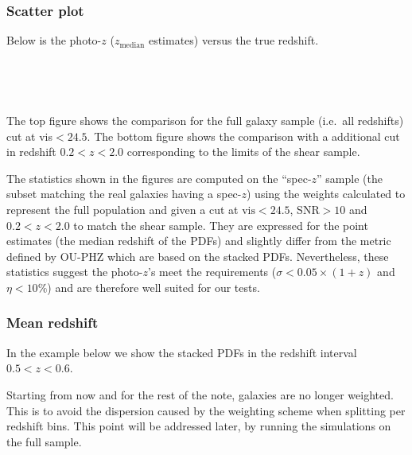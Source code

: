 \documentclass{article}
\begin{document}
\hypertarget{scatter-plot}{%
\subsubsection{Scatter plot}\label{scatter-plot}}

Below is the photo-\(z\) (\(z_\mathrm{median}\) estimates) versus the
true redshift.


    \begin{center}
    \end{center}
    { \hspace*{\fill} \\}
    
    \begin{center}
    \end{center}
    { \hspace*{\fill} \\}
    
    The top figure shows the comparison for the full galaxy sample (i.e.~all
redshifts) cut at vis\(<24.5\). The bottom figure shows the comparison
with a additional cut in redshift \(0.2<z<2.0\) corresponding to the
limits of the shear sample.

The statistics shown in the figures are computed on the ``spec-\(z\)''
sample (the subset matching the real galaxies having a spec-\(z\)) using
the weights calculated to represent the full population and given a cut
at \(\mathrm{vis}<24.5\), SNR\(>10\) and \(0.2<z<2.0\) to match the
shear sample. They are expressed for the point estimates (the median
redshift of the PDFs) and slightly differ from the metric defined by
OU-PHZ which are based on the stacked PDFs. Nevertheless, these
statistics suggest the photo-\(z\)'s meet the requirements
(\(\sigma < 0.05\times(1+z)\) and \(\eta < 10\%\)) and are therefore
well suited for our tests.

\hypertarget{mean-redshift}{%
\subsubsection{Mean redshift}\label{mean-redshift}}

In the example below we show the stacked PDFs in the redshift interval
\(0.5<z<0.6\).

Starting from now and for the rest of the note, galaxies are no longer
weighted. This is to avoid the dispersion caused by the weighting scheme
when splitting per redshift bins. This point will be addressed later, by
running the simulations on the full sample.
\end{document}
